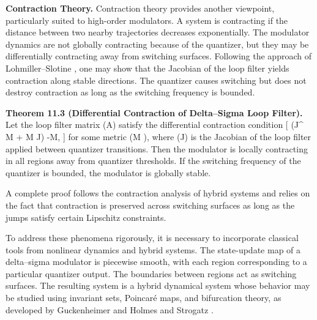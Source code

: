 \medskip

\textbf{Contraction Theory.}
Contraction theory provides another viewpoint, particularly suited to high-order modulators. A system is contracting if the distance between two nearby trajectories decreases exponentially. The modulator dynamics are not globally contracting because of the quantizer, but they may be differentially contracting away from switching surfaces. Following the approach of Lohmiller–Slotine \cite{lohmillerslotine1998contraction}, one may show that the Jacobian of the loop filter yields contraction along stable directions. The quantizer causes switching but does not destroy contraction as long as the switching frequency is bounded.

\medskip

\textbf{Theorem 11.3 (Differential Contraction of Delta–Sigma Loop Filter).}
Let the loop filter matrix (A) satisfy the differential contraction condition
[
(J^{\top} M + M J) \preceq -\lambda M,
]
for some metric (M ), where (J) is the Jacobian of the loop filter applied between quantizer transitions. Then the modulator is locally contracting in all regions away from quantizer thresholds. If the switching frequency of the quantizer is bounded, the modulator is globally stable.

A complete proof follows the contraction analysis of hybrid systems and relies on the fact that contraction is preserved across switching surfaces as long as the jumps satisfy certain Lipschitz constraints.

To address these phenomena rigorously, it is necessary to incorporate classical tools from nonlinear dynamics and hybrid systems. The state-update map of a delta–sigma modulator is piecewise smooth, with each region corresponding to a particular quantizer output. The boundaries between regions act as switching surfaces. The resulting system is a hybrid dynamical system whose behavior may be studied using invariant sets, Poincaré maps, and bifurcation theory, as developed by Guckenheimer and Holmes \cite{guckenheimerholmes1983nonlineardynamics} and Strogatz \cite{strogatz1994nonlineardynamics}.

